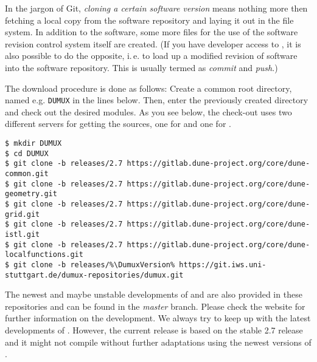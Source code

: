 In the jargon of Git, \emph{cloning a certain software version} means nothing more then fetching
a local copy from the software repository and laying it out in the file system.
In addition to the software, some more files for the use of the software revision
control system itself are created. (If you have developer access to \Dumux, it is
also possible to do the opposite, i.\,e. to load up a modified revision of software
into the software repository. This is usually termed as \emph{commit} and \emph{push}.)

The download procedure is done as follows:
Create a common root directory, named e.g. \texttt{DUMUX} in the lines below.
Then, enter the previously created directory and check out the desired modules.
As you see below, the check-out uses two different servers for getting the sources,
one for \Dune and one for \Dumux.

\begin{lstlisting}[style=Bash,escapechar=\%]
$ mkdir DUMUX
$ cd DUMUX
$ git clone -b releases/2.7 https://gitlab.dune-project.org/core/dune-common.git
$ git clone -b releases/2.7 https://gitlab.dune-project.org/core/dune-geometry.git
$ git clone -b releases/2.7 https://gitlab.dune-project.org/core/dune-grid.git
$ git clone -b releases/2.7 https://gitlab.dune-project.org/core/dune-istl.git
$ git clone -b releases/2.7 https://gitlab.dune-project.org/core/dune-localfunctions.git
$ git clone -b releases/%\DumuxVersion% https://git.iws.uni-stuttgart.de/dumux-repositories/dumux.git
\end{lstlisting}

The newest and maybe unstable developments of \Dune and \Dumux are also provided in these repositories and can be found in the \emph{master} branch.
Please check the \Dune website \cite{DUNE-HP} for further information on the \Dune development. We always try to keep up with the latest developments of \Dune.
However, the current \Dumux release is based on the stable 2.7 release and it might not compile without further adaptations using the newest versions of \Dune.

